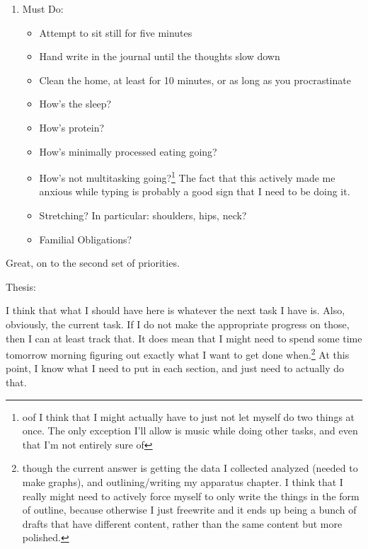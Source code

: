 \documentclass[12pt]{article}
\renewcommand{\,}{\textsuperscript{,}}
\begin{document}
\begin{enumerate}

\item Must Do:

\begin{itemize}

\item Attempt to sit still for five minutes

\item Hand write in the journal until the thoughts slow down

\item Clean the home, at least for 10 minutes, or as long as you procrastinate

\item How's the sleep?

\item How's protein?

\item How's minimally processed eating going?

\item How's not multitasking going?\footnote{oof I think that I might actually have to just not let myself do two things at once. The only exception I'll allow is music while doing other tasks, and even that I'm not entirely sure of} The fact that this actively made me anxious while typing is probably a good sign that I need to be doing it.

\item Stretching? In particular: shoulders, hips, neck?

\item Familial Obligations?

\end{itemize}

\end{enumerate}

Great, on to the second set of priorities.

Thesis:

I think that what I should have here is whatever the next task I have is.  
Also, obviously, the current task.  
If I do not make the appropriate progress on those, then I can at least track that.  
It does mean that I might need to spend some time tomorrow morning figuring out exactly what I want to get done when.\footnote{though the current answer is getting the data I collected analyzed (needed to make graphs), and outlining/writing my apparatus chapter. I think that I really might need to actively force myself to only write the things in the form of outline, because otherwise I just freewrite and it ends up being a bunch of drafts that have different content, rather than the same content but more polished.}
At this point, I know what I need to put in each section, and just need to actually do that.
\end{document}
